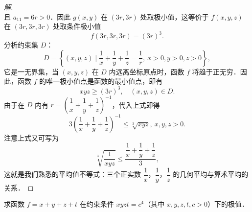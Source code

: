 \begin{proof}[解]
\[\]
且 $a_{11}=6r>0$．因此 $g(x,y)$ 在 $(3r,3r)$ 处取极小值，这等价于 $f(x,y,z)$ 在 $(3r,3r,3r)$ 处取条件极小值
\[
f(3r,3r,3r)=(3r)^{3}.
\]
分析约束集 $D$：
\[
D=\left\{(x,y,z)\mid\frac{1}{x}+\frac{1}{y}+\frac{1}{z}=\frac{1}{r},\ x>0,y>0,z>0\right\},
\]
它是一无界集，当 $(x,y,z)$ 在 $D$ 内远离坐标原点时，函数 $f$ 将趋于正无穷．因此，函数 $f$ 的唯一极小值点是函数的最小值点，即有
\[
xyz\geqslant(3r)^{3},\quad(x,y,z)\in D.
\]
由于在 $D$ 内有 $r=\left(\dfrac{1}{x}+\dfrac{1}{y}+\dfrac{1}{z}\right)^{-1}$，代入上式即得
\[
3\left(\frac{1}{x}+\frac{1}{y}+\frac{1}{z}\right)^{-1}\leqslant\sqrt[3]{xyz},\ x,y,z>0.
\]
注意上式又可写为
\[
\sqrt[3]{\frac{1}{xyz}}\leqslant\frac{\dfrac{1}{x}+\dfrac{1}{y}+\dfrac{1}{z}}{3},
\]
这就是我们熟悉的平均值不等式：三个正实数 $\dfrac{1}{x}$，$\dfrac{1}{y}$，$\dfrac{1}{z}$ 的几何平均与算术平均的关系．
\end{proof}

\begin{example}\label{ex:18-2-2}
求函数 $f=x+y+z+t$ 在约束条件 $xyzt=c^{4}$（其中 $x,y,z,t,c>0$）下的极值．
\end{example}

